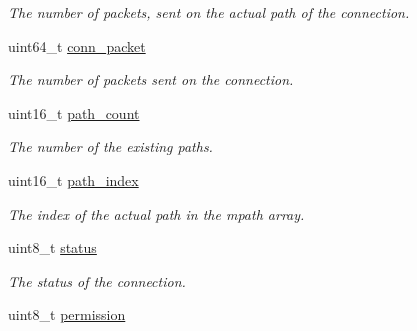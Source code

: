 \begin{DoxyCompactItemize}
\begin{DoxyCompactList}\small\item\em The number of packets, sent on the actual path of the connection. \end{DoxyCompactList}\item 
\hypertarget{structconnection__struct_afe28509736814c741e545391a9aa9c79}{uint64\-\_\-t \hyperlink{structconnection__struct_afe28509736814c741e545391a9aa9c79}{conn\-\_\-packet}}\label{structconnection__struct_afe28509736814c741e545391a9aa9c79}

\begin{DoxyCompactList}\small\item\em The number of packets sent on the connection. \end{DoxyCompactList}\item 
\hypertarget{structconnection__struct_afce7cfe89e54ae2d8ed39aaf52114e90}{uint16\-\_\-t \hyperlink{structconnection__struct_afce7cfe89e54ae2d8ed39aaf52114e90}{path\-\_\-count}}\label{structconnection__struct_afce7cfe89e54ae2d8ed39aaf52114e90}

\begin{DoxyCompactList}\small\item\em The number of the existing paths. \end{DoxyCompactList}\item 
\hypertarget{structconnection__struct_a15346e71aa7e721fa1f7ba17621ae332}{uint16\-\_\-t \hyperlink{structconnection__struct_a15346e71aa7e721fa1f7ba17621ae332}{path\-\_\-index}}\label{structconnection__struct_a15346e71aa7e721fa1f7ba17621ae332}

\begin{DoxyCompactList}\small\item\em The index of the actual path in the mpath array. \end{DoxyCompactList}\item 
\hypertarget{structconnection__struct_ade818037fd6c985038ff29656089758d}{uint8\-\_\-t \hyperlink{structconnection__struct_ade818037fd6c985038ff29656089758d}{status}}\label{structconnection__struct_ade818037fd6c985038ff29656089758d}

\begin{DoxyCompactList}\small\item\em The status of the connection. \end{DoxyCompactList}\item 
\hypertarget{structconnection__struct_acefb597af4a0f6be05b7c992c8740d53}{uint8\-\_\-t \hyperlink{structconnection__struct_acefb597af4a0f6be05b7c992c8740d53}{permission}}\label{structconnection__struct_acefb597af4a0f6be05b7c992c8740d53}


\end{DoxyCompactItemize}
